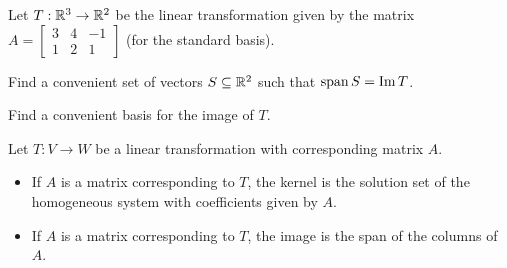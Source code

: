 \begin{applicationActivities}{2}{18}
\begin{activity}{10}
Let $T: \mathbb{R}^3 \rightarrow \mathbb{R}^2$ be the linear transformation given by the matrix $A=\begin{bmatrix} 3 & 4 & -1 \\ 1 & 2 & 1 \end{bmatrix}$ (for the standard basis).
\begin{subactivity}
Find a convenient set of vectors \(S\subseteq\mathbb{R}^2\) such that \(\operatorname{span} S=\operatorname{Im} T\).
\end{subactivity}
\begin{subactivity}
Find a convenient basis for the image of $T$.
\end{subactivity}
\end{activity}

\begin{observation}
Let $T: V \rightarrow W$ be a linear transformation with corresponding matrix $A$.

\begin{itemize}
\item If $A$ is a matrix corresponding to $T$, the kernel is the solution set of the homogeneous system with coefficients given by $A$.
\item If $A$ is a matrix corresponding to $T$, the image is the span of the columns of $A$.
\end{itemize}
\end{observation}

\end{applicationActivities}
